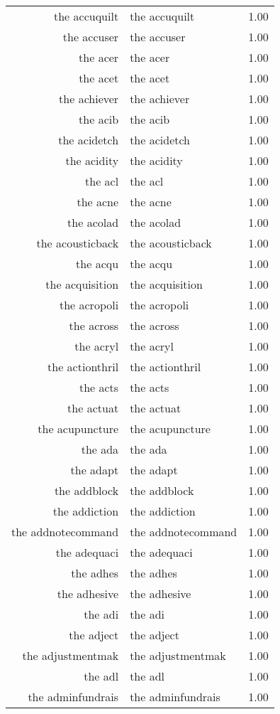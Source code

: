 \begin{table}[ht]
\begin{tabular}{rlr}
  the accuquilt & the accuquilt & 1.00 \\ 
  the accuser & the accuser & 1.00 \\ 
  the acer & the acer & 1.00 \\ 
  the acet & the acet & 1.00 \\ 
  the achiever & the achiever & 1.00 \\ 
  the acib & the acib & 1.00 \\ 
  the acidetch & the acidetch & 1.00 \\ 
  the acidity & the acidity & 1.00 \\ 
  the acl & the acl & 1.00 \\ 
  the acne & the acne & 1.00 \\ 
  the acolad & the acolad & 1.00 \\ 
  the acousticback & the acousticback & 1.00 \\ 
  the acqu & the acqu & 1.00 \\ 
  the acquisition & the acquisition & 1.00 \\ 
  the acropoli & the acropoli & 1.00 \\ 
  the across & the across & 1.00 \\ 
  the acryl & the acryl & 1.00 \\ 
  the actionthril & the actionthril & 1.00 \\ 
  the acts & the acts & 1.00 \\ 
  the actuat & the actuat & 1.00 \\ 
  the acupuncture & the acupuncture & 1.00 \\ 
  the ada & the ada & 1.00 \\ 
  the adapt & the adapt & 1.00 \\ 
  the addblock & the addblock & 1.00 \\ 
  the addiction & the addiction & 1.00 \\ 
  the addnotecommand & the addnotecommand & 1.00 \\ 
  the adequaci & the adequaci & 1.00 \\ 
  the adhes & the adhes & 1.00 \\ 
  the adhesive & the adhesive & 1.00 \\ 
  the adi & the adi & 1.00 \\ 
  the adject & the adject & 1.00 \\ 
  the adjustmentmak & the adjustmentmak & 1.00 \\ 
  the adl & the adl & 1.00 \\ 
  the adminfundrais & the adminfundrais & 1.00 \\ 

\end{tabular}
\end{table}
